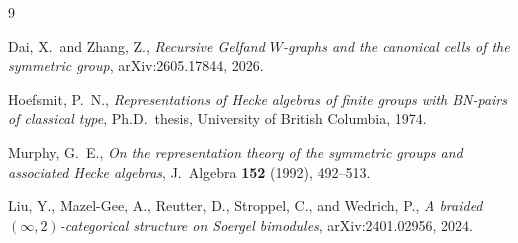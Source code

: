 \documentclass[11pt]{article}
\theoremstyle{definition}
\begin{document}
\begin{thebibliography}{9}

Dai, X.\ and Zhang, Z.,
\emph{Recursive Gelfand $W$-graphs and the canonical cells of the
symmetric group},
arXiv:2605.17844, 2026.

Hoefsmit, P.\ N.,
\emph{Representations of Hecke algebras of finite groups with BN-pairs
of classical type},
Ph.D.\ thesis, University of British Columbia, 1974.

Murphy, G.\ E.,
\emph{On the representation theory of the symmetric groups and
associated Hecke algebras},
J.\ Algebra \textbf{152} (1992), 492--513.

Liu, Y., Mazel-Gee, A., Reutter, D., Stroppel, C., and Wedrich, P.,
\emph{A braided $(\infty, 2)$-categorical structure on Soergel
bimodules},
arXiv:2401.02956, 2024.

\end{thebibliography}
\end{document}
